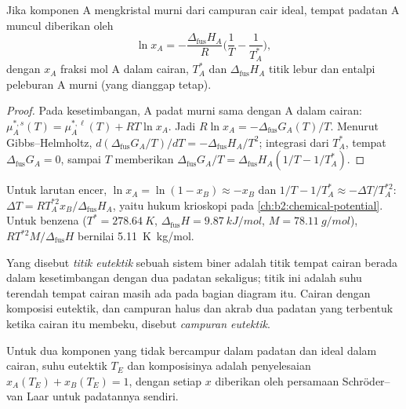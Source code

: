 \begin{theorem}\label{thm:b2:solid-liquid-diagrams:schroder}
Jika komponen A mengkristal murni dari campuran cair ideal,  tempat
padatan A muncul diberikan oleh
\[
  \ln x_A = -\frac{\Delta_{\text{fus}}H_A}{R}\Big(\frac1T - \frac1{T_A^*}\Big),
\]
dengan $x_A$ fraksi mol A dalam cairan, $T_A^*$ dan $\Delta_{\text{fus}}H_A$
titik lebur dan entalpi peleburan A murni (yang dianggap tetap).
\end{theorem}

\begin{proof}
Pada kesetimbangan,  A padat murni sama dengan  A dalam cairan: $\mu_A^{*,s}(T) = \mu_A^{*,\ell}(T) + RT\ln x_A$.
Jadi $R\ln x_A =
-\Delta_{\text{fus}}G_A(T)/T$. Menurut Gibbs--Helmholtz,
$d(\Delta_{\text{fus}}G_A/T)/
dT = -\Delta_{\text{fus}}H_A/T^2$; integrasi dari $T_A^*$, tempat
$\Delta_{\text{fus}}G_A = 0$, sampai $T$ memberikan
$\Delta_{\text{fus}}G_A/T =
\Delta_{\text{fus}}H_A(1/T - 1/T_A^*)$.
\end{proof}

Untuk larutan encer, $\ln x_A = \ln(1 - x_B) \approx -x_B$ dan
$1/T -
1/T_A^* \approx -\Delta T/T_A^{*2}$:
$\Delta T = RT_A^{*2}x_B/\Delta_{\text{fus}}H_A$, yaitu hukum krioskopi
pada \cref{ch:b2:chemical-potential}. Untuk benzena
($T^* =
\qty{278.64}{K}$, $\Delta_{\text{fus}}H = \qty{9.87}{kJ/mol}$,
$M =
\qty{78.11}{g/mol}$),  $RT^{*2}M/\Delta_{\text{fus}}H$
bernilai \qty{5.11}{K.kg/mol}.

\begin{definition}[Eutektik]\label{def:b2:solid-liquid-diagrams:eutectic}
Yang disebut \emph{titik eutektik} sebuah sistem
biner adalah titik tempat cairan berada dalam kesetimbangan dengan dua
padatan sekaligus; titik ini adalah suhu terendah tempat cairan masih ada
pada bagian diagram itu. Cairan dengan komposisi eutektik, dan campuran
halus dan akrab dua padatan yang terbentuk ketika cairan itu membeku,
disebut \emph{campuran eutektik}.
\end{definition}

\begin{corollary}\label{cor:b2:solid-liquid-diagrams:eutectic}
Untuk dua komponen yang tidak bercampur dalam padatan dan ideal dalam
cairan, suhu eutektik $T_E$ dan komposisinya adalah penyelesaian
$x_A(T_E) + x_B(T_E) = 1$, dengan setiap $x$ diberikan oleh persamaan
Schröder--van Laar untuk padatannya sendiri.
\end{corollary}

